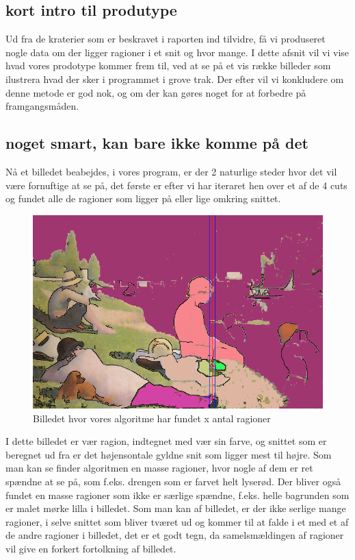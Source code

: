 \subsection{kort intro til produtype}
Ud fra de kraterier som er beskravet i raporten ind tilvidre, få vi
produseret nogle data om der ligger ragioner i et snit og hvor mange. I
dette afsnit vil vi vise hvad vores prodotype kommer frem til, ved at se
på et vis række billeder som ilustrera hvad der sker i programmet i
grove trak. Der efter vil vi konkludere om denne metode er god nok, og
om der kan gøres noget for at forbedre på framgangsmåden.


\subsection{noget smart, kan bare ikke komme på det}
Nå et billedet beabejdes, i vores program, er der 2 naturlige steder
hvor det vil være fornuftige at se på, det første er efter vi har
iteraret hen over et af de 4 cuts og fundet alle de ragioner som ligger
på eller lige omkring snittet.

\begin{figure}[h]
	\begin{center}
		\includegraphics[scale=0.42,angle=0]{afsnit/afprovning/billeder/floodfillbilledet.png}
	\end{center}
	\caption[]{Billedet hvor vores algoritme har fundet x antal ragioner}
	\label{ff}
\end{figure}

I dette billedet er vær ragion, indtegnet med vær sin farve, og snittet
som er beregnet ud fra er det højensontale gyldne snit som ligger mest
til højre. Som man kan se finder algoritmen en masse ragioner, hvor
nogle af dem er ret spændne at se på, som f.eks. drengen som er farvet
helt lyserød. Der bliver også fundet en masse ragioner som ikke er
særlige spændne, f.eks. helle bagrunden som er malet mørke lilla i
billedet. Som man kan af billedet, er der ikke serlige mange ragioner, i
selve snittet som bliver tværet ud og kommer til at falde i et med et af
de andre ragioner i billedet, det er et godt tegn, da samelsmældingen af
ragioner vil give en forkert fortolkning af billedet.

